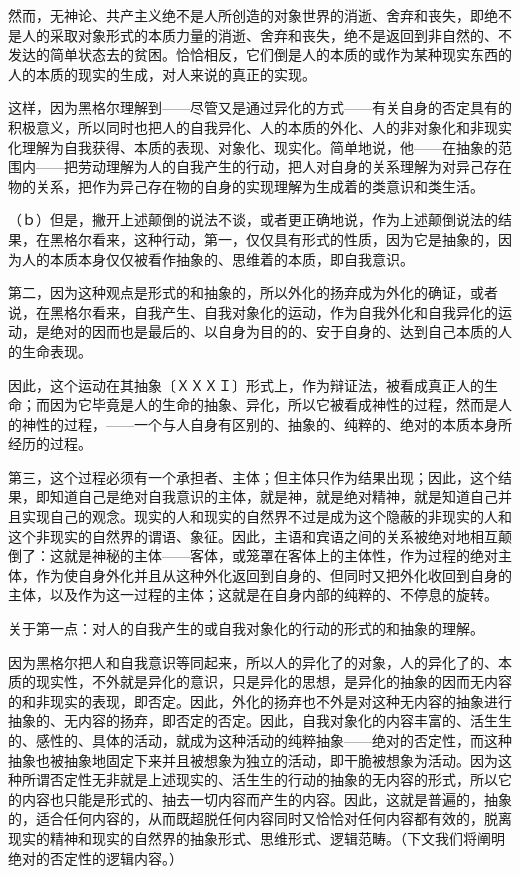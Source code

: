 \documentclass[a4paper,twoside,12pt]{ctexart}
\begin{document}
然而，无神论、共产主义绝不是人所创造的对象世界的消逝、舍弃和丧失，即绝不是人的采取对象形式的本质力量的消逝、舍弃和丧失，绝不是返回到非自然的、不发达的简单状态去的贫困。恰恰相反，它们倒是人的本质的或作为某种现实东西的人的本质的现实的生成，对人来说的真正的实现。

这样，因为黑格尔理解到——尽管又是通过异化的方式——有关自身的否定具有的积极意义，所以同时也把人的自我异化、人的本质的外化、人的非对象化和非现实化理解为自我获得、本质的表现、对象化、现实化。简单地说，他——在抽象的范围内——把劳动理解为人的自我产生的行动，把人对自身的关系理解为对异己存在物的关系，把作为异己存在物的自身的实现理解为生成着的类意识和类生活。

（ｂ）但是，撇开上述颠倒的说法不谈，或者更正确地说，作为上述颠倒说法的结果，在黑格尔看来，这种行动，第一，仅仅具有形式的性质，因为它是抽象的，因为人的本质本身仅仅被看作抽象的、思维着的本质，即自我意识。

第二，因为这种观点是形式的和抽象的，所以外化的扬弃成为外化的确证，或者说，在黑格尔看来，自我产生、自我对象化的运动，作为自我外化和自我异化的运动，是绝对的因而也是最后的、以自身为目的的、安于自身的、达到自己本质的人的生命表现。

因此，这个运动在其抽象〔ＸＸＸＩ〕形式上，作为辩证法，被看成真正人的生命；而因为它毕竟是人的生命的抽象、异化，所以它被看成神性的过程，然而是人的神性的过程，——一个与人自身有区别的、抽象的、纯粹的、绝对的本质本身所经历的过程。

第三，这个过程必须有一个承担者、主体；但主体只作为结果出现；因此，这个结果，即知道自己是绝对自我意识的主体，就是神，就是绝对精神，就是知道自己并且实现自己的观念。现实的人和现实的自然界不过是成为这个隐蔽的非现实的人和这个非现实的自然界的谓语、象征。因此，主语和宾语之间的关系被绝对地相互颠倒了：这就是神秘的主体——客体，或笼罩在客体上的主体性，作为过程的绝对主体，作为使自身外化并且从这种外化返回到自身的、但同时又把外化收回到自身的主体，以及作为这一过程的主体；这就是在自身内部的纯粹的、不停息的旋转。

关于第一点：对人的自我产生的或自我对象化的行动的形式的和抽象的理解。

因为黑格尔把人和自我意识等同起来，所以人的异化了的对象，人的异化了的、本质的现实性，不外就是异化的意识，只是异化的思想，是异化的抽象的因而无内容的和非现实的表现，即否定。因此，外化的扬弃也不外是对这种无内容的抽象进行抽象的、无内容的扬弃，即否定的否定。因此，自我对象化的内容丰富的、活生生的、感性的、具体的活动，就成为这种活动的纯粹抽象——绝对的否定性，而这种抽象也被抽象地固定下来并且被想象为独立的活动，即干脆被想象为活动。因为这种所谓否定性无非就是上述现实的、活生生的行动的抽象的无内容的形式，所以它的内容也只能是形式的、抽去一切内容而产生的内容。因此，这就是普遍的，抽象的，适合任何内容的，从而既超脱任何内容同时又恰恰对任何内容都有效的，脱离现实的精神和现实的自然界的抽象形式、思维形式、逻辑范畴。（下文我们将阐明绝对的否定性的逻辑内容。）
\end{document}
